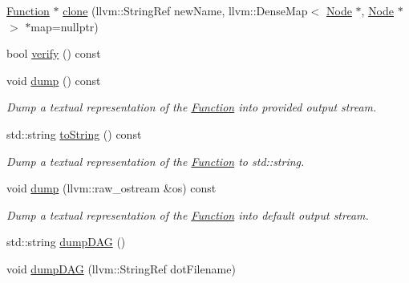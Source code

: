 \begin{DoxyCompactItemize}
\hyperlink{classglow_1_1_function}{Function} $\ast$ \hyperlink{classglow_1_1_function_a52bb076e6a99804a4349e1cb3b54291f}{clone} (llvm\+::\+String\+Ref new\+Name, llvm\+::\+Dense\+Map$<$ \hyperlink{classglow_1_1_node}{Node} $\ast$, \hyperlink{classglow_1_1_node}{Node} $\ast$$>$ $\ast$map=nullptr)
\item 
bool \hyperlink{classglow_1_1_function_a73897a61138cf69eacb41357839815df}{verify} () const
\item 
\mbox{\label{classglow_1_1_function_a61d47fdde36a323d732b9f74e18fca55}} 
void \hyperlink{classglow_1_1_function_a61d47fdde36a323d732b9f74e18fca55}{dump} () const
\begin{DoxyCompactList}\small\item\em Dump a textual representation of the \hyperlink{classglow_1_1_function}{Function} into provided output stream. \end{DoxyCompactList}\item 
\mbox{\label{classglow_1_1_function_a7f2478eeed56907e1b9fb0bed6d8bd2a}} 
std\+::string \hyperlink{classglow_1_1_function_a7f2478eeed56907e1b9fb0bed6d8bd2a}{to\+String} () const
\begin{DoxyCompactList}\small\item\em Dump a textual representation of the \hyperlink{classglow_1_1_function}{Function} to std\+::string. \end{DoxyCompactList}\item 
\mbox{\label{classglow_1_1_function_ae59478d0dd1e2b501de0e71ab508a4f6}} 
void \hyperlink{classglow_1_1_function_ae59478d0dd1e2b501de0e71ab508a4f6}{dump} (llvm\+::raw\+\_\+ostream \&os) const
\begin{DoxyCompactList}\small\item\em Dump a textual representation of the \hyperlink{classglow_1_1_function}{Function} into default output stream. \end{DoxyCompactList}\item 
std\+::string \hyperlink{classglow_1_1_function_a25f5f7d84157c8c3c20faeb82c083c2d}{dump\+D\+AG} ()
\item 
\mbox{\label{classglow_1_1_function_a3e8e3a9043edf5869ee13618fb04b731}} 
void \hyperlink{classglow_1_1_function_a3e8e3a9043edf5869ee13618fb04b731}{dump\+D\+AG} (llvm\+::\+String\+Ref dot\+Filename)
$$
\end{DoxyCompactItemize}
